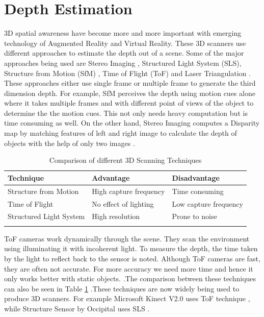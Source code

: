\section{Depth Estimation}
3D spatial awareness have become more and more important with emerging technology of Augmented Reality and Virtual Reality. These 3D scanners use different approaches to estimate the depth out of a scene. Some of the major approaches being used are Stereo Imaging \cite{stereoimaging}, Structured Light System (SLS), Structure from Motion (SfM) \cite{sfm}, Time of Flight (ToF) \cite{timeofflight} and Laser Triangulation \cite{3DLasertechnique}. These approaches either use single frame or multiple frame to generate the third dimension depth. For example, SfM perceives the depth using motion cues alone where it takes multiple frames and with different point of views of the object to determine the the motion cues\cite{sfm}. This not only needs heavy computation but is time consuming as well. On the other hand, Stereo Imaging computes a Disparity map by matching features of left and right image to calculate the depth of objects with the help of only two images \cite{stereoimaging}.

\begin{table}[h]
\begin{tabular}{@{}lll@{}}
\toprule
\textbf{Technique}                    & \textbf{Advantage}           & \textbf{Disadvantage}         \\ \midrule
Structure from Motion          & High capture frequency & Time consuming                 \\
Time of Flight       & No effect of lighting & Low capture frequency     \\
Structured Light System        & High resolution   & Prone to noise                 \\ 
                            &                     &                                               
\end{tabular}
\caption{Comparison of different 3D Scanning Techniques} 
\label{table:3DScanning}
\end{table}


ToF cameras work dynamically through the scene. They scan the environment using illuminating it with incoherent light. To measure the depth, the time taken by the light to reflect back to the sensor is noted. Although ToF cameras are fast, they are often not accurate. For more accuracy we need more time and hence it only works better with static objects. \cite{tof2}.The comparison between these techniques can also be seen in Table \ref{table:3DScanning} .These techniques are now widely being used to produce 3D scanners. For example Microsoft Kinect V2.0 uses ToF technique \cite{kinecttof}, while Structure Sensor by Occipital uses SLS \cite{Kalantari}.\\

